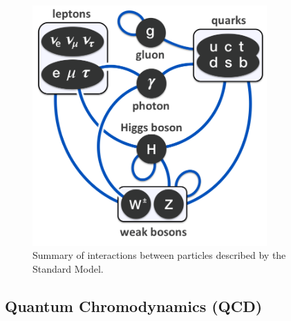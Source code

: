 \begin{figure}
\begin{centering}
\includegraphics[width=0.8\textwidth]{fig/1.Introduction/Standard_Model}
\par\end{centering}

\protect\caption{Summary of interactions between particles described by the Standard
Model.}


\label{fig:SM}
\end{figure}



\subsection{Quantum Chromodynamics (QCD)}

